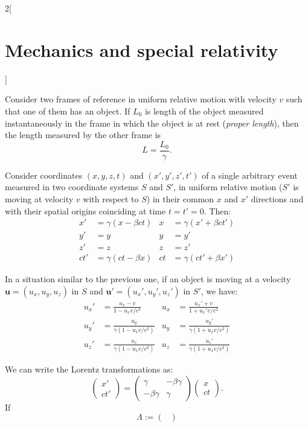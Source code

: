 \documentclass[../../../main.tex]{subfiles}
\begin{document}
\begin{multicols}{2}[\section{Mechanics and special relativity}]
\begin{concept}
Consider two frames of reference in uniform relative motion with velocity $v$ such that one of them has an object. If $L_0$ is length of the object measured instantaneously in the frame in which the object is at rest (\textit{proper length}), then the length measured by the other frame is
$$L=\frac{L_0}{\gamma}.$$
\end{concept}
\begin{concept}
Consider coordinates $(x,y,z,t)$ and $(x',y',z',t')$ of a single arbitrary event measured in two coordinate systems $S$ and $S'$, in uniform relative motion ($S'$ is moving at velocity $v$ with respect to $S$) in their common $x$ and $x'$ directions and  with their spatial origins coinciding at time $t=t'=0$. Then:
\begin{align*}
    x'&=\gamma(x-\beta ct) & x&=\gamma(x'+\beta ct')\\
    y'&=y & y&=y'\\
    z'&=z & z&=z'\\
    ct'&=\gamma(ct-\beta x) & ct&=\gamma(ct'+\beta x')
\end{align*}
\end{concept}
\begin{concept}
In a situation similar to the previous one, if an object is moving at a velocity $\boldsymbol{u}=(u_x,u_y,u_z)$ in $S$ and $\boldsymbol{u'}=(u_x',u_y',u_z')$ in $S'$, we have:
\begin{align*}
    u_x'&=\frac{u_x-v}{1-u_xv/c^2} & u_x&=\frac{u_x'+v}{1+u_x'v/c^2}\\
    u_y'&=\frac{u_y}{\gamma \left(1-u_xv/c^2\right)} & u_y&=\frac{u_y'}{\gamma \left(1+u_xv/c^2\right)}\\
    u_z'&=\frac{u_z}{\gamma \left(1-u_xv/c^2\right)} & u_z&=\frac{u_z'}{\gamma \left(1+u_xv/c^2\right)}
\end{align*}
\end{concept}
\begin{concept}
We can write the Lorentz transformations as: 
$$\begin{pmatrix}
x'\\
ct'
\end{pmatrix}=\begin{pmatrix}
\gamma & -\beta\gamma\\
-\beta\gamma & \gamma
\end{pmatrix}\begin{pmatrix}
x\\
ct
\end{pmatrix}.$$ If $$\Lambda:=\begin{pmatrix}

\end{pmatrix}$$
\end{concept}
\end{multicols}
\end{document}
